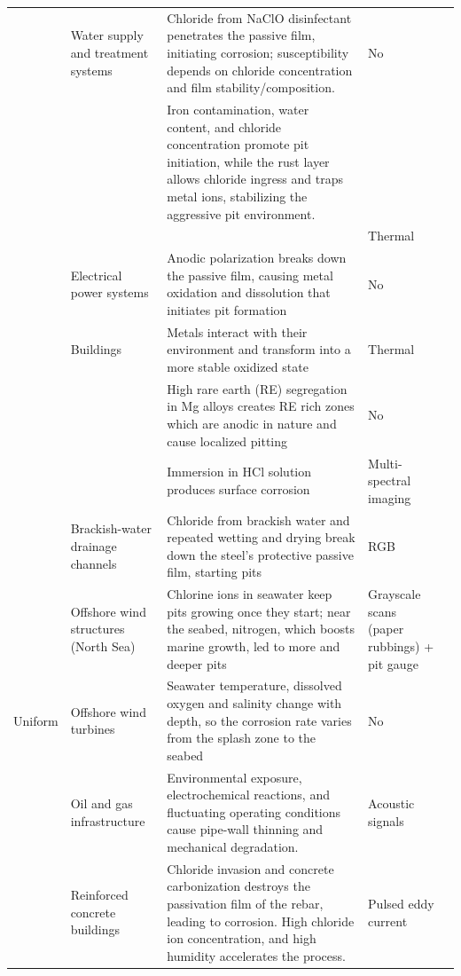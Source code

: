 {\begin{xltabular}{\textwidth}{>{\RaggedRight\arraybackslash}p{1.5cm}>{\RaggedRight\arraybackslash}p{2.6cm}>{\RaggedRight\arraybackslash}X>{\RaggedRight\arraybackslash}p{2.4cm}>{\RaggedRight\arraybackslash}p{1.9cm}}
 & Water supply and treatment systems & Chloride from NaClO disinfectant penetrates the passive film, initiating corrosion; susceptibility depends on chloride concentration and film stability/composition. & No & \citep{Li2022,Nguyen2026} \\
 &  & Iron contamination, water content, and chloride concentration promote pit initiation, while the rust layer allows chloride ingress and traps metal ions, stabilizing the aggressive pit environment. &  &  \\
 &  &  & Thermal & \citep{Liu2021} \\
 & Electrical power systems & Anodic polarization breaks down the passive film, causing metal oxidation and dissolution that initiates pit formation & No & \citep{Wojciechowski2025} \\
 & Buildings & Metals interact with their environment and transform into a more stable oxidized state & Thermal & \citep{Elizalde2023} \\
 &  & High rare earth (RE) segregation in Mg alloys creates RE rich zones which are anodic in nature and cause localized pitting & No & \citep{Qin2026} \\
 &  & Immersion in HCl solution produces surface corrosion & Multi-spectral imaging & \citep{Egodawela2025} \\
 & Brackish-water drainage channels & Chloride from brackish water and repeated wetting and drying break down the steel's protective passive film, starting pits & RGB & \citep{Suzuki2026} \\
 & Offshore wind structures (North Sea) & Chlorine ions in seawater keep pits growing once they start; near the seabed, nitrogen, which boosts marine growth, led to more and deeper pits & Grayscale scans (paper rubbings) + pit gauge & \citep{Khodabux2021a} \\
\midrule
Uniform & Offshore wind turbines & Seawater temperature, dissolved oxygen and salinity change with depth, so the corrosion rate varies from the splash zone to the seabed & No & \citep{Khodabux2020} \\
 & Oil and gas infrastructure & Environmental exposure, electrochemical reactions, and fluctuating operating conditions cause pipe-wall thinning and mechanical degradation. & Acoustic signals & \citep{Yang2026a} \\
 & Reinforced concrete buildings & Chloride invasion and concrete carbonization destroys the passivation film of the rebar, leading to corrosion. High chloride ion concentration, and high humidity accelerates the process. & Pulsed eddy current & \citep{Yang2025} \\

\end{xltabular}}

